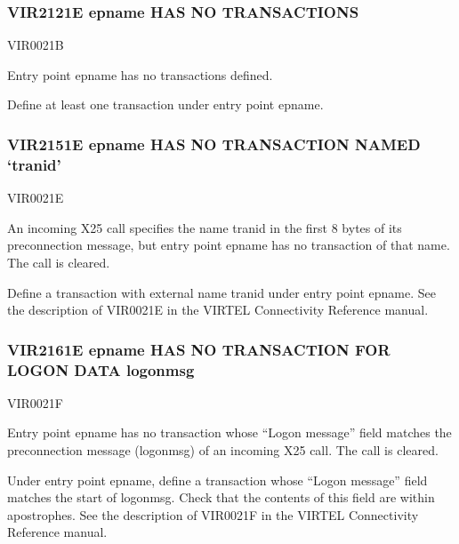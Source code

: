 \documentclass[letterpaper,10pt,english]{sphinxmanual}
\begin{document}
\subsubsection{VIR2121E epname HAS NO TRANSACTIONS}
\label{\detokenize{messages:vir2121e-epname-has-no-transactions}}\begin{description}
\sphinxAtStartPar
VIR0021B

\sphinxAtStartPar
Entry point epname has no transactions defined.

\sphinxAtStartPar
Define at least one transaction under entry point epname.

\end{description}


\subsubsection{VIR2151E epname HAS NO TRANSACTION NAMED ‘tranid’}
\label{\detokenize{messages:vir2151e-epname-has-no-transaction-named-tranid}}\begin{description}
\sphinxAtStartPar
VIR0021E

\sphinxAtStartPar
An incoming X25 call specifies the name tranid in the first 8 bytes of its preconnection message, but entry point epname has no transaction of that name. The call is cleared.

\sphinxAtStartPar
Define a transaction with external name tranid under entry point epname. See the description of VIR0021E in the VIRTEL Connectivity Reference manual.

\end{description}


\subsubsection{VIR2161E epname HAS NO TRANSACTION FOR LOGON DATA logonmsg}
\label{\detokenize{messages:vir2161e-epname-has-no-transaction-for-logon-data-logonmsg}}\begin{description}
\sphinxAtStartPar
VIR0021F

\sphinxAtStartPar
Entry point epname has no transaction whose “Logon message” field matches the preconnection message (logonmsg) of an incoming X25 call. The call is cleared.

\sphinxAtStartPar
Under entry point epname, define a transaction whose “Logon message” field matches the start of logonmsg. Check that the contents of this field are within apostrophes. See the description of VIR0021F in the VIRTEL Connectivity Reference manual.

\end{description}
\end{document}
